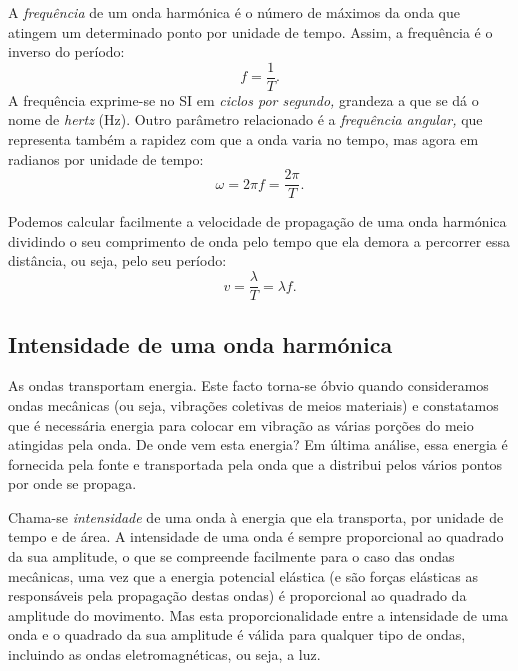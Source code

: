 A \emph{frequência} de um onda harmónica é o número de máximos da onda que
atingem um determinado ponto por unidade de tempo. Assim, a frequência é o
inverso do período:
\begin{equation*}
    f=\frac{1}{T}.
\end{equation*}
A frequência exprime-se no SI em \emph{ciclos por segundo,} grandeza a que se dá
o nome de \emph{hertz} (Hz).
Outro parâmetro relacionado é a \emph{frequência angular,} que representa também
a rapidez com que a onda varia no tempo, mas agora em radianos por unidade de
tempo:
\begin{equation*}
\omega = 2\pi f= \frac{2\pi}{T}.
\end{equation*}

Podemos calcular facilmente a velocidade de propagação de uma onda harmónica
dividindo o seu comprimento de onda pelo tempo que ela demora a percorrer essa
distância, ou seja, pelo seu período:
\begin{equation*}
v=\frac{\lambda}{T} = \lambda f.
\end{equation*}


\subsection{Intensidade de uma onda harmónica}
As ondas transportam energia. Este facto torna-se óbvio quando consideramos
ondas mecâ\-nicas (ou seja, vibrações coletivas de meios materiais) e constatamos
que é necessária energia para colocar em vibração as várias porções do meio
atingidas pela onda. De onde vem esta energia? Em última análise, essa energia é
fornecida pela fonte e transportada pela onda que a distribui pelos vários
pontos por onde se propaga.

Chama-se \emph{intensidade} de uma onda à energia que ela transporta, por
unidade de tempo e de área. A intensidade de uma onda é sempre proporcional ao
quadrado da sua amplitude, o que se compreende facilmente para o caso das ondas
mecânicas, uma vez que a energia potencial elástica (e são forças elásticas as
responsáveis pela propagação destas ondas) é proporcional ao quadrado da
amplitude do movimento. Mas esta proporcionalidade entre a intensidade de uma
onda e o quadrado da sua amplitude é válida para qualquer tipo de ondas,
incluindo as ondas eletromagnéticas, ou seja, a luz.

